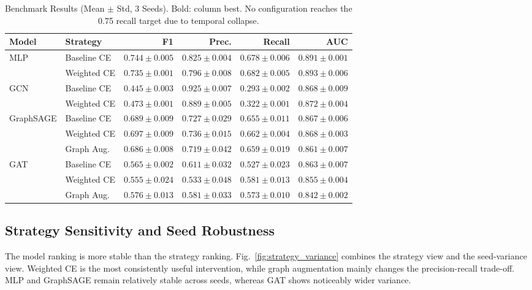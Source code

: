 \documentclass[journal,10pt,twoside]{IEEEtran}
\begin{document}
\begin{table}[!t]
\centering
\caption{Benchmark Results (Mean $\pm$ Std, 3 Seeds). Bold: column best.
  No configuration reaches the 0.75 recall target due to temporal collapse.}
\label{tab:main_results}
\small
\setlength{\tabcolsep}{5pt}
\begin{tabular}{llrrrr}
\toprule
\textbf{Model} & \textbf{Strategy}
  & \textbf{F1} & \textbf{Prec.}
  & \textbf{Recall} & \textbf{AUC} \\
\midrule
\multirow{2}{*}{MLP}
  & Baseline CE
    & $\mathbf{0.744\pm0.005}$ & $\mathbf{0.825\pm0.004}$
    & $0.678\pm0.006$ & $0.891\pm0.001$ \\
  & Weighted CE
    & $0.735\pm0.001$ & $0.796\pm0.008$
    & $0.682\pm0.005$ & $\mathbf{0.893\pm0.006}$ \\
\midrule
\multirow{2}{*}{GCN}
  & Baseline CE
    & $0.445\pm0.003$ & $0.925\pm0.007$
    & $0.293\pm0.002$ & $0.868\pm0.009$ \\
  & Weighted CE
    & $0.473\pm0.001$ & $0.889\pm0.005$
    & $0.322\pm0.001$ & $0.872\pm0.004$ \\
\midrule
\multirow{3}{*}{GraphSAGE}
  & Baseline CE
    & $0.689\pm0.009$ & $0.727\pm0.029$
    & $0.655\pm0.011$ & $0.867\pm0.006$ \\
  & Weighted CE
    & $0.697\pm0.009$ & $0.736\pm0.015$
    & $0.662\pm0.004$ & $0.868\pm0.003$ \\
  & Graph Aug.
    & $0.686\pm0.008$ & $0.719\pm0.042$
    & $0.659\pm0.019$ & $0.861\pm0.007$ \\
\midrule
\multirow{3}{*}{GAT}
  & Baseline CE
    & $0.565\pm0.002$ & $0.611\pm0.032$
    & $0.527\pm0.023$ & $0.863\pm0.007$ \\
  & Weighted CE
    & $0.555\pm0.024$ & $0.533\pm0.048$
    & $\mathbf{0.581\pm0.013}$ & $0.855\pm0.004$ \\
  & Graph Aug.
    & $0.576\pm0.013$ & $0.581\pm0.033$
    & $0.573\pm0.010$ & $0.842\pm0.002$ \\
\bottomrule
\end{tabular}
\end{table}

\subsection{Strategy Sensitivity and Seed Robustness}

The model ranking is more stable than the strategy ranking.
Fig.~\ref{fig:strategy_variance} combines the strategy view and the
seed-variance view. Weighted CE is the most consistently useful
intervention, while graph augmentation mainly changes the
precision-recall trade-off. MLP and GraphSAGE remain relatively stable
across seeds, whereas GAT shows noticeably wider variance.
\end{document}
